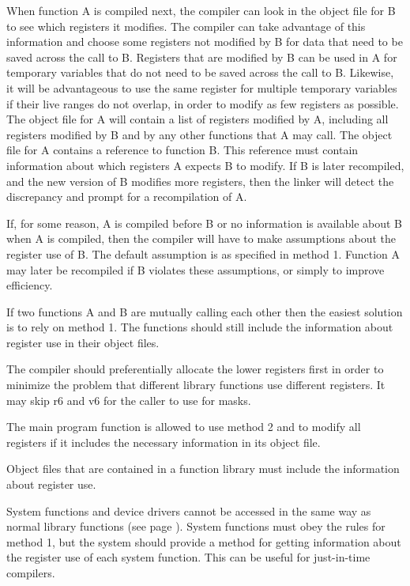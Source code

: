 \documentclass[forwardcom.tex]{subfiles}
\begin{document}
When function A is compiled next, the compiler can look in the object file for B to see which registers it modifies. The compiler can take advantage of this information and choose some registers not modified by B for data that need to be saved across the call to B. Registers that are modified by B can be used in A for temporary variables that do not need to be saved across the call to B. Likewise, it will be advantageous to use the same register for multiple temporary variables if their live ranges do not overlap, in order to modify as few registers as possible. The object file for A will contain a list of registers modified by A, including all registers modified by B and by any other functions that A may call. The object file for A contains a reference to function B. This reference must contain information about which registers A expects B to modify. If B is later recompiled, and the new version of B modifies more registers, then the linker will detect the discrepancy and prompt for a recompilation of A.
\vv

If, for some reason, A is compiled before B or no information is available about B when A is compiled, then the compiler will have to make assumptions about the register use of B. The default assumption is as specified in method 1. Function A may later be recompiled if B violates these assumptions, or simply to improve efficiency. 
\vv

If two functions A and B are mutually calling each other then the easiest solution is to rely on method 1. The functions should still include the information about register use in their object files. 
\vv

The compiler should preferentially allocate the lower registers first in order to minimize the problem that different library functions use different registers. It may skip r6 and v6 for the caller to use for masks. 
\vv

The main program function is allowed to use method 2 and to modify all registers if it includes the necessary information in its object file. 
\vv

Object files that are contained in a function library must include the information about register use. 
\vv

System functions and device drivers cannot be accessed in the same way as normal library functions (see page \pageref{systemCallIDSystem}). System functions must obey the rules for method 1, but the system should provide a method for getting information about the register use of each system function. This can be useful for just-in-time compilers. 
\end{document}
